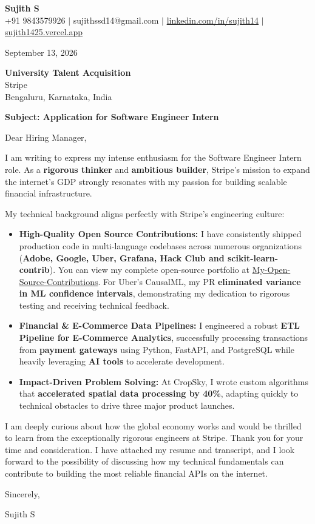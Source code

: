\documentclass[a4paper,11pt]{article}
\begin{document}
\pagestyle{empty}

\begin{center}
{\color[HTML]{000000}\fontsize{24}{28}\selectfont\bfseries Sujith S} \\[5pt]
{\fontsize{10.5}{12.5}\selectfont\textcolor[HTML]{3A3A3A}{+91 9843579926 $|$ sujithssd14@gmail.com $|$ \href{https://linkedin.com/in/sujith14}{linkedin.com/in/sujith14} $|$ \href{https://sujith1425.vercel.app}{sujith1425.vercel.app}}}
\end{center}

\vspace{2em}

September 13, 2026

\textbf{University Talent Acquisition} \\
Stripe \\
Bengaluru, Karnataka, India

\textbf{Subject: Application for Software Engineer Intern}

Dear Hiring Manager,

I am writing to express my intense enthusiasm for the Software Engineer Intern role. As a \textbf{rigorous thinker} and \textbf{ambitious builder}, Stripe’s mission to expand the internet’s GDP strongly resonates with my passion for building scalable financial infrastructure. 

My technical background aligns perfectly with Stripe's engineering culture:
\begin{itemize}
    \item \textbf{High-Quality Open Source Contributions:} I have consistently shipped production code in multi-language codebases across numerous organizations (\textbf{Adobe, Google, Uber, Grafana, Hack Club and scikit-learn-contrib}). You can view my complete open-source portfolio at \href{https://github.com/su-jin1425/My-Open-Source-Contributions}{My-Open-Source-Contributions}. For Uber's CausalML, my PR \textbf{eliminated variance in ML confidence intervals}, demonstrating my dedication to rigorous testing and receiving technical feedback.
    \item \textbf{Financial \& E-Commerce Data Pipelines:} I engineered a robust \textbf{ETL Pipeline for E-Commerce Analytics}, successfully processing transactions from \textbf{payment gateways} using Python, FastAPI, and PostgreSQL while heavily leveraging \textbf{AI tools} to accelerate development.
    \item \textbf{Impact-Driven Problem Solving:} At CropSky, I wrote custom algorithms that \textbf{accelerated spatial data processing by 40\%}, adapting quickly to technical obstacles to drive three major product launches.
\end{itemize}

I am deeply curious about how the global economy works and would be thrilled to learn from the exceptionally rigorous engineers at Stripe. Thank you for your time and consideration. I have attached my resume and transcript, and I look forward to the possibility of discussing how my technical fundamentals can contribute to building the most reliable financial APIs on the internet.

Sincerely,

\vspace{1em}
Sujith S
\end{document}
